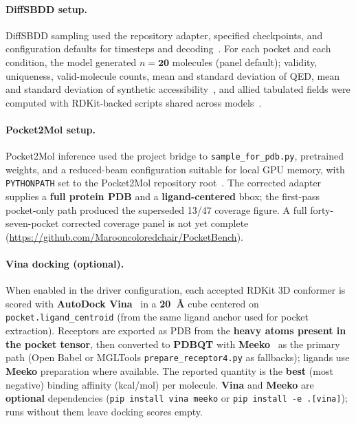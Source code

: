 \documentclass[11pt]{article}
\begin{document}
\paragraph{DiffSBDD setup.}
DiffSBDD sampling used the repository adapter, specified checkpoints, and configuration defaults for timesteps and decoding~\cite{schneuing2022}. For each pocket and each condition, the model generated $n = \textbf{20}$ molecules (panel default); validity, uniqueness, valid-molecule counts, mean and standard deviation of QED, mean and standard deviation of synthetic accessibility~\cite{ertl2009sa}, and allied tabulated fields were computed with RDKit-backed scripts shared across models~\cite{landrum2023rdkit}.

\paragraph{Pocket2Mol setup.}
Pocket2Mol inference used the project bridge to \texttt{sample\_for\_pdb.py}, pretrained weights, and a reduced-beam configuration suitable for local GPU memory, with \texttt{PYTHONPATH} set to the Pocket2Mol repository root~\cite{peng2022pocket2mol}. The corrected adapter supplies a \textbf{full protein PDB} and a \textbf{ligand-centered} bbox; the first-pass pocket-only path produced the superseded 13/47 coverage figure. A full forty-seven-pocket corrected coverage panel is not yet complete (\url{https://github.com/Marooncoloredchair/PocketBench}).

\paragraph{Vina docking (optional).}
When enabled in the driver configuration, each accepted RDKit 3D conformer is scored with \textbf{AutoDock Vina}~\cite{eberhardt2021vina} in a \textbf{20~\r{A}} cube centered on \texttt{pocket.ligand\_centroid} (from the same ligand anchor used for pocket extraction). Receptors are exported as PDB from the \textbf{heavy atoms present in the pocket tensor}, then converted to \textbf{PDBQT} with \textbf{Meeko}~\cite{ioannidis2023meeko} as the primary path (Open Babel or MGLTools \texttt{prepare\_receptor4.py} as fallbacks); ligands use \textbf{Meeko} preparation where available. The reported quantity is the \textbf{best} (most negative) binding affinity (kcal/mol) per molecule. \textbf{Vina} and \textbf{Meeko} are \textbf{optional} dependencies (\verb|pip install vina meeko| or \verb|pip install -e .[vina]|); runs without them leave docking scores empty.
\end{document}
